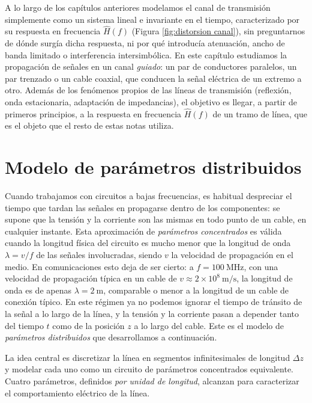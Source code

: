 A lo largo de los capítulos anteriores modelamos el canal de transmisión simplemente como un sistema lineal e invariante en el tiempo, caracterizado por su respuesta en frecuencia $\hat{H}(f)$ (Figura \ref{fig:distorsion canal}), sin preguntarnos de dónde surgía dicha respuesta, ni por qué introducía atenuación, ancho de banda limitado o interferencia intersimbólica. En este capítulo estudiamos la propagación de señales en un canal \emph{guiado}: un par de conductores paralelos, un par trenzado o un cable coaxial, que conducen la señal eléctrica de un extremo a otro. Además de los fenómenos propios de las líneas de transmisión (reflexión, onda estacionaria, adaptación de impedancias), el objetivo es llegar, a partir de primeros principios, a la respuesta en frecuencia $\hat{H}(f)$ de un tramo de línea, que es el objeto que el resto de estas notas utiliza.

\section{Modelo de parámetros distribuidos}\label{sec:parametros distribuidos}

Cuando trabajamos con circuitos a bajas frecuencias, es habitual despreciar el tiempo que tardan las señales en propagarse dentro de los componentes: se supone que la tensión y la corriente son las mismas en todo punto de un cable, en cualquier instante. Esta aproximación de \emph{parámetros concentrados} es válida cuando la longitud física del circuito es mucho menor que la longitud de onda $\lambda = v/f$ de las señales involucradas, siendo $v$ la velocidad de propagación en el medio. En comunicaciones esto deja de ser cierto: a $f=100\ \unit{\mega\hertz}$, con una velocidad de propagación típica en un cable de $v\approx 2\times 10^8\ \unit{\meter/\second}$, la longitud de onda es de apenas $\lambda = 2\ \unit{\meter}$, comparable o menor a la longitud de un cable de conexión típico. En este régimen ya no podemos ignorar el tiempo de tránsito de la señal a lo largo de la línea, y la tensión y la corriente pasan a depender tanto del tiempo $t$ como de la posición $z$ a lo largo del cable. Este es el modelo de \emph{parámetros distribuidos} que desarrollamos a continuación.

La idea central es discretizar la línea en segmentos infinitesimales de longitud $\Delta z$ y modelar cada uno como un circuito de parámetros concentrados equivalente. Cuatro parámetros, definidos \emph{por unidad de longitud}, alcanzan para caracterizar el comportamiento eléctrico de la línea.

